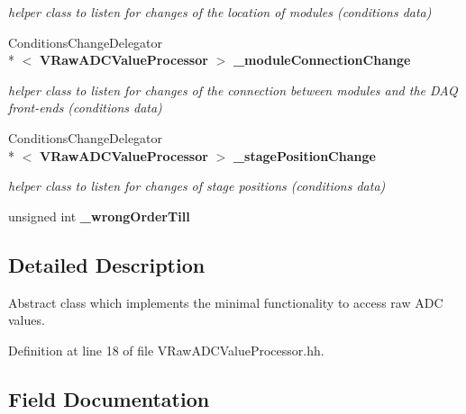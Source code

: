 \begin{DoxyCompactItemize}
\begin{DoxyCompactList}\small\item\em helper class to listen for changes of the location of modules (conditions data) \end{DoxyCompactList}\item 
Conditions\-Change\-Delegator\\*
$<$ {\bf V\-Raw\-A\-D\-C\-Value\-Processor} $>$ {\bf \-\_\-module\-Connection\-Change}\label{classCALICE_1_1VRawADCValueProcessor_a854695da8e7fe2c647ac8415367987d5}

\begin{DoxyCompactList}\small\item\em helper class to listen for changes of the connection between modules and the D\-A\-Q front-\/ends (conditions data) \end{DoxyCompactList}\item 
Conditions\-Change\-Delegator\\*
$<$ {\bf V\-Raw\-A\-D\-C\-Value\-Processor} $>$ {\bf \-\_\-stage\-Position\-Change}\label{classCALICE_1_1VRawADCValueProcessor_a9aec2fb84d7a380d73995bf3d21205b9}

\begin{DoxyCompactList}\small\item\em helper class to listen for changes of stage positions (conditions data) \end{DoxyCompactList}\item 
unsigned int {\bfseries \-\_\-wrong\-Order\-Till}\label{classCALICE_1_1VRawADCValueProcessor_ac89301a31fbc0418b25ebd3c7c3680f9}

\end{DoxyCompactItemize}


\subsection{Detailed Description}
Abstract class which implements the minimal functionality to access raw A\-D\-C values. 

Definition at line 18 of file V\-Raw\-A\-D\-C\-Value\-Processor.\-hh.



\subsection{Field Documentation}
